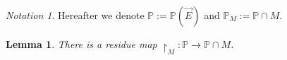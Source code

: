 \documentclass[11pt]{amsart}
\newtheorem{lemma}[theorem]{Lemma}
\theoremstyle{definition}
\theoremstyle{remark}
\newtheorem{notation}[theorem]{Notation}
\newcommand\tom[1]{\marginpar{Tom: #1}}
\newcommand\ale[1]{\marginpar{Alejandro: #1}}
\begin{document}
\begin{notation}
Hereafter we denote $\mathbb{P}:=\mathbb{P}(\vec{E})$ and $\mathbb{P}_M:=\mathbb{P}\cap M$.   
\end{notation}


\begin{lemma}\label{lemma: residue}
    There is a  residue map $\restriction_M\colon \mathbb{P}\to \mathbb{P}\cap M$. %
\end{lemma}
\end{document}
